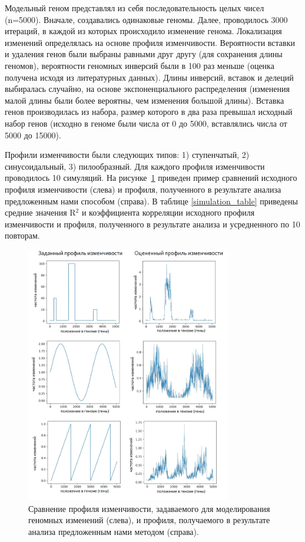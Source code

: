 Модельный геном представлял из себя последовательность целых чисел (n=5000). Вначале, создавались одинаковые геномы. Далее, проводилось 3000 итераций, в каждой из которых происходило изменение генома. Локализация изменений определялась на основе профиля изменчивости. Вероятности вставки и удаления генов были выбраны равными друг другу (для сохранения длины геномов), вероятности геномных инверсий были в 100 раз меньше (оценка получена исходя из литературных данных). Длины инверсий, вставок и делеций выбиралась случайно, на основе экспоненциального распределения (изменения малой длины были более вероятны, чем изменения большой длины). Вставка генов производилась из набора, размер которого в два раза превышал исходный набор генов (исходно в геноме были числа от 0 до 5000, вставлялись числа от 5000 до 15000).

Профили изменчивости были следующих типов: 1) ступенчатый, 2) синусоидальный, 3) пилообразный. Для каждого профиля изменчивости проводилось 10 симуляций. На рисунке~\ref{img:simulation} приведен пример сравнений исходного профиля изменчивости (слева) и профиля, полученного в результате анализа предложенным нами способом (справа). В таблице \ref{simulation_table} приведены средние значения R$^{2}$ и коэффициента корреляции исходного профиля изменчивости и профиля, полученного в результате анализа и усредненного по 10 повторам. 

\begin{figure}[!ht] 
  \center
    \includegraphics[width=0.8\textwidth]{Dissertation/images/complexity/simulation.png}
  \caption{Сравнение профиля изменчивости, задаваемого для моделирования геномных изменений (слева), и профиля, получаемого в результате анализа предложенным нами методом (справа). }
  \label{img:simulation} 
\end{figure}

